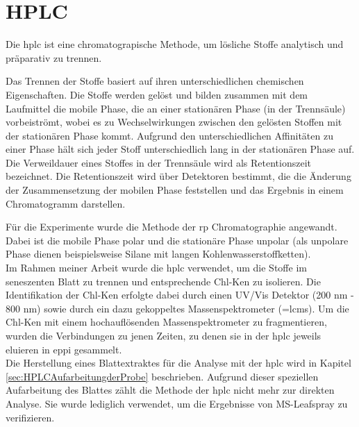 \section{HPLC}

Die \gls{hplc} ist eine chromatograpische Methode, um lösliche Stoffe analytisch und präparativ zu trennen. \cite[S. 165]{Chromatographie} 

Das Trennen der Stoffe basiert auf ihren unterschiedlichen chemischen Eigenschaften. Die Stoffe werden gelöst und bilden zusammen mit dem Laufmittel die mobile Phase, die an einer stationären Phase (in der Trennsäule) vorbeiströmt, wobei es zu Wechselwirkungen zwischen den gelösten Stoffen mit der stationären Phase kommt. Aufgrund den unterschiedlichen Affinitäten zu einer Phase hält sich jeder Stoff unterschiedlich lang in der stationären Phase auf. Die Verweildauer eines Stoffes in der Trennsäule wird als Retentionszeit bezeichnet. \cite[S. 31-32]{Chromatographie} Die Retentionszeit wird über Detektoren bestimmt, die die Änderung der Zusammensetzung der mobilen Phase feststellen und das Ergebnis in einem Chromatogramm darstellen. \cite[S. 46]{Chromatographie} 

Für die Experimente wurde die Methode der \gls{rp} Chromatographie angewandt. Dabei ist die mobile Phase polar und die stationäre Phase unpolar (als unpolare Phase dienen beispielsweise Silane mit langen Kohlenwasserstoffketten). \cite[S. 189]{Chromatographie}\\

Im Rahmen meiner Arbeit wurde die \gls{hplc} verwendet, um die Stoffe im seneszenten Blatt zu trennen und entsprechende \gls{Chl-K}en zu isolieren. Die Identifikation der \gls{Chl-K}en erfolgte dabei durch einen UV/Vis Detektor (200 nm - 800 nm) sowie durch ein dazu gekoppeltes Massenspektrometer (=\gls{lcms}). Um die \gls{Chl-K}en mit einem hochauflösenden Massenspektrometer zu fragmentieren, wurden die Verbindungen zu jenen Zeiten, zu denen sie in der \gls{hplc} jeweils eluieren in \gls{eppi} gesammelt.\\

Die Herstellung eines Blattextraktes für die Analyse mit der \gls{hplc} wird in Kapitel \ref{sec:HPLCAufarbeitungderProbe} beschrieben. Aufgrund dieser speziellen Aufarbeitung des Blattes zählt die Methode der \gls{hplc} nicht mehr zur direkten Analyse. Sie wurde lediglich verwendet, um die Ergebnisse von MS-Leafspray zu verifizieren.
